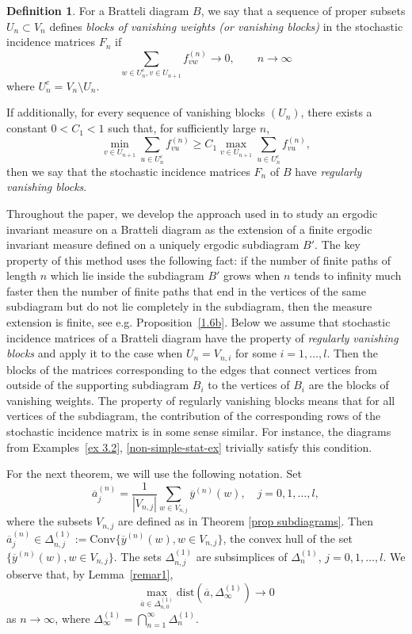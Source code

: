 \documentclass[11pt, english, reqno]{amsart}
\theoremstyle{definition}
\newtheorem{defin}{Definition}[section]
\theoremstyle{remark}
\theoremstyle{plain}
\def\ov{\overline}
\numberwithin{equation}{section}
\begin{document}
{\begin{defin}\label{def vanishing blocks}
For a Bratteli diagram $B$,  we say that a sequence of proper subsets
$U_n \subset V_n$ defines \textit{blocks of vanishing weights
(or vanishing blocks)} in the stochastic incidence matrices $F_n$ if
$$
 \sum_{w \in U^c_n, v \in U_{n+1}} f_{vw}^{(n)} \rightarrow 0, \qquad
 n \rightarrow \infty
 $$
 where $U_n^c = V_n \setminus U_n$.

If additionally, for every sequence of vanishing blocks $(U_n)$, there exists
a constant  $0 < C_1 < 1$ such that, for sufficiently large $n$,
\begin{equation}\label{eq vanish blocks}
\min_{v\in U_{n+1}} \sum_{u \in U_{n}^c} f_{vu}^{(n)}
\geq C_1 \max_{v\in U_{n+1}} \sum_{u \in U_{n}^c}  f_{vu}^{(n)},
\end{equation}
then we say that the stochastic incidence matrices $F_n$ of $B$ have
 \textit{regularly vanishing blocks}.
\end{defin}

Throughout the paper, we develop the approach used in \cite{BezuglyiKwiatkowskiMedynetsSolomyak2010, BezuglyiKwiatkowskiMedynetsSolomyak2013, AdamskaBezuglyiKarpelKwiatkowski2016} to study an ergodic invariant measure on a Bratteli diagram as the extension of a finite ergodic invariant measure defined on a uniquely ergodic subdiagram $B'$. The key property of this method uses the following fact: if the number of finite paths of length $n$ which lie inside the subdiagram $B'$ grows when $n$ tends to infinity much faster then the number of finite paths that end in the vertices of the same subdiagram but do not lie completely in the subdiagram, then the measure extension is finite, see e.g. Proposition~\ref{1.6b}. 
Below we assume that stochastic incidence matrices of a Bratteli diagram have the property of {\it regularly vanishing blocks} and apply it to the case when $U_n = V_{n,i}$ for some $i = 1, \ldots, l$. 
Then the blocks of the matrices corresponding to the edges that connect vertices from outside of the supporting subdiagram $B_i$ to the vertices of $B_i$ are the blocks of vanishing weights. 
The property of regularly vanishing blocks means that for all vertices of the subdiagram, 
the contribution of the corresponding rows of the stochastic incidence matrix is in some sense similar. For instance, the diagrams from Examples~\ref{ex 3.2}, \ref{non-simple-stat-ex} trivially satisfy this condition.

For the next theorem,  we will use  the following notation. Set
$$
\ov a_j^{(n)} = \frac{1}{|V_{n,j}|} \sum_{w \in V_{n,j}} \ov y^{(n)}(w),
\quad j = 0, 1, \ldots, l,
$$
where the subsets $V_{n,j}$ are defined as in Theorem
\ref{prop subdiagrams}.
Then $\ov a_j^{(n)} \in \Delta_{n,j}^{(1)} :=
\textrm{Conv}\{\ov y^{(n)}(w),
w \in V_{n,j}\}$, the convex hull of the set $\{\ov y^{(n)}(w),
w \in V_{n,j}\}$.   The sets $\Delta_{n,j}^{(1)}$ are subsimplices of
$\Delta_n^{(1)}$, $j = 0, 1, \ldots, l$.
We observe that, by Lemma~\ref{remar1},
 $$
 \max_{\ov a \in \Delta_{n,0}^{(1)}}
\textrm{dist}(\ov a, \Delta_{\infty}^{(1)}) \rightarrow 0
$$
as $n \rightarrow \infty$, where $\Delta_{\infty}^{(1)} =
\bigcap_{n=1}^{\infty}\Delta_n^{(1)}$.
\medskip

}
\end{document}
